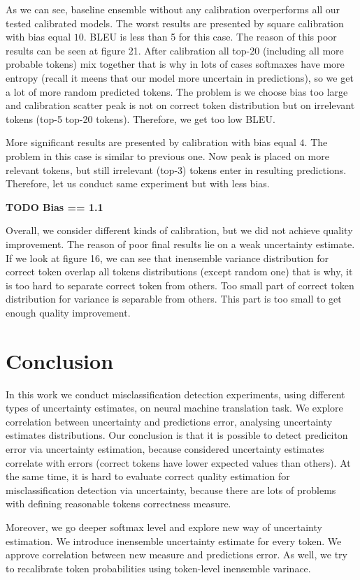 \documentclass[a4paper,14pt]{extarticle}
\begin{document}
	As we can see, baseline ensemble without any calibration overperforms all our tested calibrated models. The worst results are presented by square calibration with bias equal $10$. BLEU is less than 5 for this case. The reason of this poor results can be seen at figure 21. After calibration all top-20 (including all more probable tokens) mix together that is why in lots of cases softmaxes have more entropy (recall it meens that our model more uncertain in predictions), so we get a lot of more random predicted tokens. The problem is we choose bias too large and calibration scatter peak is not on correct token distribution but on irrelevant tokens (top-5 top-20 tokens). Therefore, we get too low BLEU.
	
	More significant results are presented by calibration with bias equal $4$. The problem in this case is similar to previous one. Now peak is placed on more relevant tokens, but still irrelevant (top-3) tokens enter in resulting predictions. Therefore, let us conduct same experiment but with less bias.
	
	\textbf{TODO Bias == 1.1}
	
	Overall, we consider different kinds of calibration, but we did not achieve quality improvement. The reason of poor final results lie on a weak uncertainty estimate. If we look at figure 16, we can see that inensemble variance distribution for correct token overlap all tokens distributions (except random one) that is why, it is too hard to separate correct token from others. Too small part of correct token distribution for variance is separable from others. This part is too small to get enough quality improvement.
\section{Conclusion}
	In this work we conduct misclassification detection experiments, using different types of uncertainty estimates, on neural machine translation task. We explore correlation between uncertainty and predictions error, analysing uncertainty estimates distributions. Our conclusion is that it is possible to detect prediciton error via uncertainty estimation, because considered uncertainty estimates correlate with errors (correct tokens have lower expected values than others). At the same time, it is hard to evaluate correct quality estimation for misclassification detection via uncertainty, because there are lots of problems with defining reasonable tokens correctness measure.
	
	Moreover, we go deeper softmax level and explore new way of uncertainty estimation. We introduce inensemble uncertainty estimate for every token. We approve correlation between new measure and predictions error. As well, we try to recalibrate token probabilities using token-level inensemble varinace.
	
\end{document}
